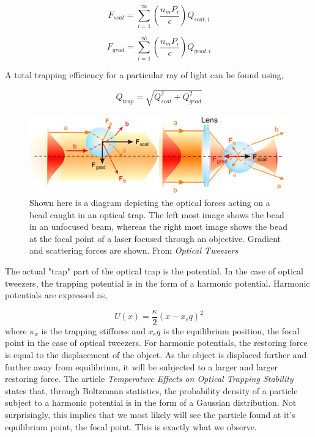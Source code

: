 \documentclass[%
 aip,
 amsmath,amssymb,
 reprint,%
]{revtex4-1}
\begin{document}
    \begin{equation}
        F_{scat} = \sum_{i=1}^{\infty} (\frac{n_m P_i}{c}) Q_{scat, i}
    \end{equation}
    
    \begin{equation}
        F_{grad} = \sum_{i=1}^{\infty} (\frac{n_m P_i}{c}) Q_{grad, i}
    \end{equation}
    
    A total trapping efficiency for a particular ray of light\cite{brownian} can be found using,
    
    \begin{equation}
    Q_{trap}=\sqrt{Q_{scat}^2 + Q_{grad}^2}
    \end{equation}
    
    
    
\begin{figure}[h]
    \centering
    \includegraphics[scale=.57]{Forces diagram.PNG}
    \caption{Shown here is a diagram depicting the optical forces acting on a bead caught in an optical trap. The left most image shows the bead in an unfocused beam, whereas the right most image shows the bead at the focal point of a laser focused through an objective. Gradient and scattering forces are shown. From \textit{Optical Tweezers}\cite{ot}}
    \label{fig:forces}
\end{figure}

    The actual "trap" part of the optical trap is the potential. In the case of optical tweezers, the trapping potential is in the form of a harmonic potential. Harmonic potentials are expressed as,
    
    \begin{equation}
        U(x)=\frac{\kappa}{2}(x-x_eq)^2
    \end{equation}
    where $\kappa_x$ is the trapping stiffness and $x_eq$ is the equilibrium position, the focal point in the case of optical tweezers\cite{brownian}. For harmonic potentials, the restoring force is equal to the displacement of the object. As the object is displaced further and further away from equilibrium, it will be subjected to a larger and larger restoring force. The article \textit{Temperature Effects on Optical Trapping Stability}\cite{brownian} states that, through Boltzmann statistics, the probability density of a particle subject to a harmonic potential is in the form of a Gaussian distribution. Not surprisingly, this implies that we most likely will see the particle found at it's equilibrium point, the focal point. This is exactly what we observe. 
\end{document}
